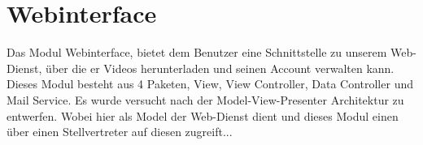 \section{Webinterface}
Das Modul Webinterface, bietet dem Benutzer eine Schnittstelle zu unserem Web-Dienst, über die er Videos herunterladen und seinen Account verwalten kann. Dieses Modul besteht aus 4 Paketen, View, View Controller, Data Controller und Mail Service. Es wurde versucht nach der Model-View-Presenter Architektur zu entwerfen. Wobei hier als Model der Web-Dienst dient und dieses Modul einen über einen Stellvertreter auf diesen zugreift...
\newpage

%
%
